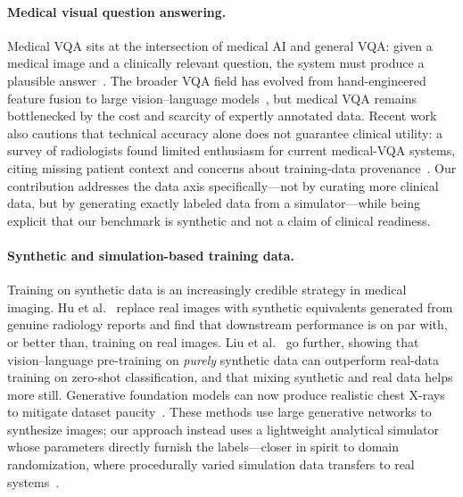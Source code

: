 \documentclass[11pt]{article}
\begin{document}
\paragraph{Medical visual question answering.}
Medical VQA sits at the intersection of medical AI and general VQA: given a
medical image and a clinically relevant question, the system must produce a
plausible answer~\cite{lin2023medvqasurvey}. The broader VQA field has evolved
from hand-engineered feature fusion to large vision--language
models~\cite{ishmam2025vqasurvey}, but medical VQA remains bottlenecked by the
cost and scarcity of expertly annotated data. Recent work also cautions that
technical accuracy alone does not guarantee clinical utility: a survey of
radiologists found limited enthusiasm for current medical-VQA systems, citing
missing patient context and concerns about training-data
provenance~\cite{jin2025medvqabarriers}. Our contribution addresses the data
axis specifically---not by curating more clinical data, but by generating exactly
labeled data from a simulator---while being explicit that our benchmark is
synthetic and not a claim of clinical readiness.

\paragraph{Synthetic and simulation-based training data.}
Training on synthetic data is an increasingly credible strategy in medical
imaging. Hu et al.~\cite{hu2023medvlpsynthetic} replace real images with
synthetic equivalents generated from genuine radiology reports and find that
downstream performance is on par with, or better than, training on real images.
Liu et al.~\cite{liu2024medvlppurelysynthetic} go further, showing that
vision--language pre-training on \emph{purely} synthetic data can outperform
real-data training on zero-shot classification, and that mixing synthetic and
real data helps more still. Generative foundation models can now produce
realistic chest X-rays to mitigate dataset paucity~\cite{bluethgen2024chestxray}.
These methods use large generative networks to synthesize images; our approach
instead uses a lightweight analytical simulator whose parameters directly furnish
the labels---closer in spirit to domain randomization, where procedurally varied
simulation data transfers to real systems~\cite{tobin2017domainrand}.
\end{document}

